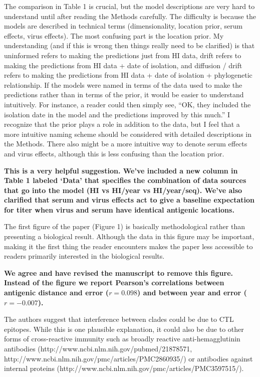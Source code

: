 \documentclass[11pt,oneside,letterpaper]{article}
\begin{document}
The comparison in Table 1 is crucial, but the model descriptions are very hard to understand until after reading the Methods carefully. The difficulty is because the models are described in technical terms (dimensionality, location prior, serum effects, virus effects). The most confusing part is the location prior. My understanding (and if this is wrong then things really need to be clarified) is that uninformed refers to making the predictions just from HI data, drift refers to making the predictions from HI data + date of isolation, and diffusion / drift refers to making the predictions from HI data + date of isolation + phylogenetic relationship. If the models were named in terms of the data used to make the predictions rather than in terms of the prior, it would be easier to understand intuitively. For instance, a reader could then simply see, ``OK, they included the isolation date in the model and the predictions improved by this much.'' I recognize that the prior plays a role in addition to the data, but I feel that a more intuitive naming scheme should be considered with detailed descriptions in the Methods. There also might be a more intuitive way to denote serum effects and virus effects, although this is less confusing than the location prior.

\textbf{This is a very helpful suggestion.  We've included a new column in Table 1 labeled `Data' that specifies the combination of data sources that go into the model (HI vs HI/year vs HI/year/seq).  We've also clarified that serum and virus effects act to give a baseline expectation for titer when virus and serum have identical antigenic locations.}

The first figure of the paper (Figure 1) is basically methodological rather than presenting a biological result. Although the data in this figure may be important, making it the first thing the reader encounters makes the paper less accessible to readers primarily interested in the biological results.

\textbf{We agree and have revised the manuscript to remove this figure.  Instead of the figure we report Pearson's correlations between antigenic distance and error ($r = 0.098$) and between year and error ($r = -0.007$).}

The authors suggest that interference between clades could be due to CTL epitopes. While this is one plausible explanation, it could also be due to other forms of cross-reactive immunity such as broadly reactive anti-hemagglutinin antibodies (http://www.ncbi.nlm.nih.gov/pubmed/21878571, http://www.ncbi.nlm.nih.gov/pmc/articles/PMC2860935/) or antibodies against internal proteins (http://www.ncbi.nlm.nih.gov/pmc/articles/PMC3597515/).
\end{document}
